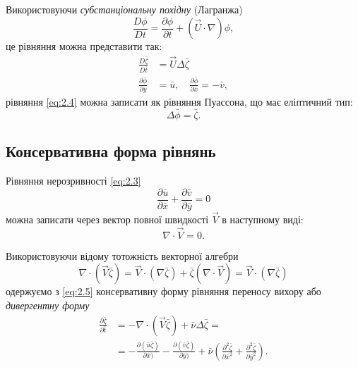 Використовуючи \textit{субстанціональну похідну} (Лагранжа)
\begin{equation}
    \dfrac{D \phi}{D t} = \dfrac{\partial \phi}{\partial t} + (\vec U \cdot \nabla) \phi,
\end{equation}
це рівняння можна представити так:
\begin{align}
    \label{eq:2.6}
    \frac{D \bar \zeta}{D \bar t} &= \vec U \Delta \bar \zeta \\
    \label{eq:2.7}
    \frac{\partial \bar \phi}{\partial \bar y} &= \bar u, \quad \frac{\partial \bar \phi}{\partial \bar x} = - \bar v,
\end{align}
рівняння \eqref{eq:2.4} можна записати як рівняння Пуассона, що має еліптичний тип:
\begin{equation}
    \label{eq:2.8}
    \Delta \bar \phi = \bar \zeta.
\end{equation}

\subsection{Консервативна форма рівнянь}

Рівняння нерозривності \eqref{eq:2.3}
\begin{equation}
    \frac{\partial \bar u}{\partial \bar x} + \frac{\partial \bar v}{\partial \bar y} = 0
\end{equation}
можна записати через вектор повної швидкості $\vec V$ в наступному виді:
\begin{equation}
    \label{eq:2.9}
    \nabla \cdot \vec V = 0.
\end{equation}

Використовуючи відому тотожність векторної алгебри
\begin{equation}
    \nabla  \cdot (\vec V \bar \zeta) = \vec V \cdot (\nabla \bar \zeta) + \bar \zeta (\nabla \cdot \vec V) = \vec V \cdot (\nabla \bar \zeta)
\end{equation}
одержуємо з \eqref{eq:2.5} консервативну форму рівняння переносу вихору або \textit{дивергентну форму}
\begin{equation}
    \label{eq:2.10}
    \begin{aligned}
        \frac{\partial \bar \zeta}{\partial \bar t} &= - \nabla \cdot (\vec V \bar \zeta) + \bar \nu \Delta \bar \zeta = \\
        &= - \frac{\partial (\bar u \bar \zeta)}{\partial \bar x)} - \frac{\partial (\bar v \bar \zeta)}{\partial \bar y)} + \bar \nu \left( \frac{\partial^2 \bar \zeta}{\partial \bar x^2} + \frac{\partial^2 \bar \zeta}{\partial \bar y^2} \right).
    \end{aligned}
\end{equation}

